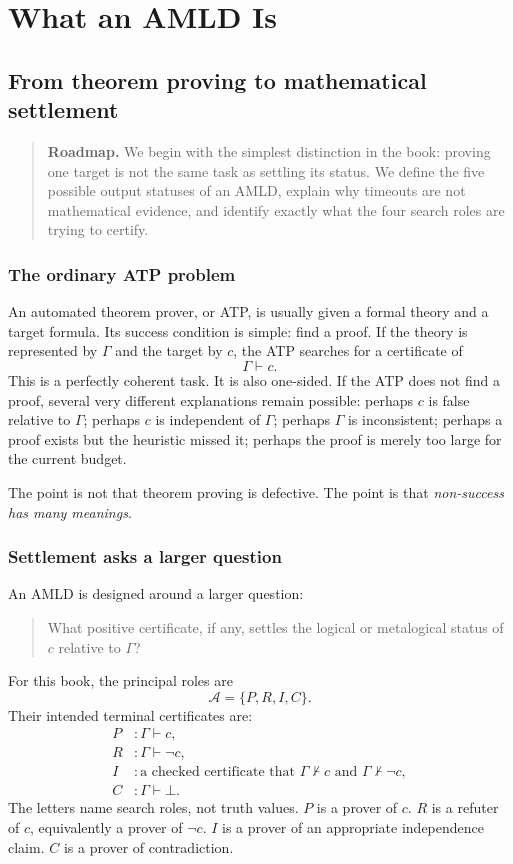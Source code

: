 \documentclass[11pt,openany]{book}
\theoremstyle{definition}
\theoremstyle{remark}
\newenvironment{roadmap}{\begin{quote}\small\color{deepblue}\textbf{Roadmap.} }{\end{quote}}
\newcommand{\Agents}{\mathcal{A}}
\newcommand{\botc}{\bot}
\begin{document}
\tableofcontents
\mainmatter

\part{What an AMLD Is}

\chapter{From theorem proving to mathematical settlement}
\begin{roadmap}
We begin with the simplest distinction in the book: proving one target is not the same task as settling its status. We define the five possible output statuses of an AMLD, explain why timeouts are not mathematical evidence, and identify exactly what the four search roles are trying to certify.
\end{roadmap}

\section{The ordinary ATP problem}
An automated theorem prover, or ATP, is usually given a formal theory and a target formula. Its success condition is simple: find a proof. If the theory is represented by $\Gamma$ and the target by $c$, the ATP searches for a certificate of
\[
\Gamma\vdash c.
\]
This is a perfectly coherent task. It is also one-sided. If the ATP does not find a proof, several very different explanations remain possible: perhaps $c$ is false relative to $\Gamma$; perhaps $c$ is independent of $\Gamma$; perhaps $\Gamma$ is inconsistent; perhaps a proof exists but the heuristic missed it; perhaps the proof is merely too large for the current budget.

The point is not that theorem proving is defective. The point is that \emph{non-success has many meanings}.

\section{Settlement asks a larger question}
An AMLD is designed around a larger question:
\begin{quote}
What positive certificate, if any, settles the logical or metalogical status of $c$ relative to $\Gamma$?
\end{quote}
For this book, the principal roles are
\[
\Agents=\{P,R,I,C\}.
\]
Their intended terminal certificates are:
\begin{align*}
P &: \Gamma\vdash c,\\
R &: \Gamma\vdash\neg c,\\
I &: \text{a checked certificate that }\Gamma\nvdash c\text{ and }\Gamma\nvdash\neg c,\\
C &: \Gamma\vdash\botc.
\end{align*}
The letters name search roles, not truth values. $P$ is a prover of $c$. $R$ is a refuter of $c$, equivalently a prover of $\neg c$. $I$ is a prover of an appropriate independence claim. $C$ is a prover of contradiction.
\end{document}
